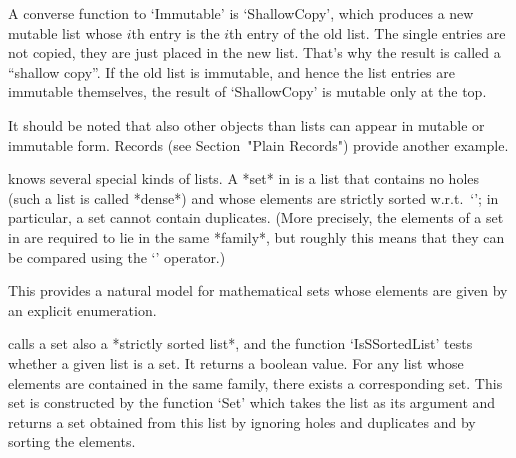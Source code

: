 A converse function to `Immutable' is `ShallowCopy', which produces a new
mutable list  whose $i$th entry  is the $i$th entry of  the old list. The
single  entries  are not copied,  they are  just placed in  the new list.
That's why the  result is called a ``shallow  copy''. If the  old list is
immutable, and hence  the  list  entries  are immutable themselves,   the
result of `ShallowCopy' is mutable only at the top.

It should be noted that also other objects than lists can appear in
mutable or immutable form.
Records (see Section~"Plain Records") provide another example.

%


%
{\GAP} knows several special kinds of lists.
A *set* in {\GAP} is a list that contains no holes
(such a list is called *dense*)
and whose elements are strictly sorted w.r.t.~`\<';
in particular, a set cannot contain duplicates.
(More precisely, the elements of a set in {\GAP} are required
to lie in the same *family*,
but roughly this means that they can be compared using the `\<' operator.)

This provides a natural model for mathematical sets
whose elements are given by an explicit enumeration.

{\GAP} calls a set also a *strictly sorted list*,
and the function `IsSSortedList' tests whether a given list is a set.
It returns a boolean value.
For any list whose elements are contained in the same family,
there exists a corresponding set.
This set is constructed by the function `Set'
which takes the list as its argument and returns a set
obtained from this list by ignoring holes and duplicates
and by sorting the elements.

